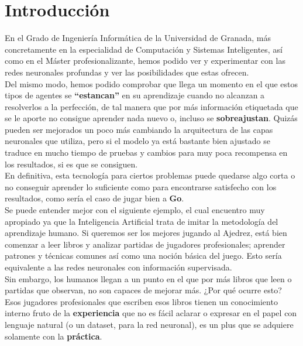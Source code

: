 \documentclass[11pt,fleqn]{book} %
\begin{document}
\section*{Introducción}

En el Grado de Ingeniería Informática de la Universidad de Granada, más concretamente en la especialidad de Computación y Sistemas Inteligentes, así como en el Máster profesionalizante, hemos podido ver y experimentar con las redes neuronales profundas y ver las posibilidades que estas ofrecen. \\

Del mismo modo, hemos podido comprobar que llega un momento en el que estos tipos de agentes se \textbf{``estancan''} en su aprendizaje cuando no alcanzan a resolverlos a la perfección, de tal manera que por más información etiquetada que se le aporte no consigue aprender nada nuevo o, incluso se \textbf{sobreajustan}. Quizás pueden ser mejorados un poco más cambiando la arquitectura de las capas neuronales que utiliza, pero si el modelo ya está bastante bien ajustado se traduce en mucho tiempo de pruebas y cambios para muy poca recompensa en los resultados, si es que se consiguen. \\

En definitiva, esta tecnología para ciertos problemas puede quedarse algo corta o no conseguir aprender lo suficiente como para encontrarse satisfecho con los resultados, como sería el caso de jugar bien a \textbf{Go}.\cite{article:go} \\

Se puede entender mejor con el siguiente ejemplo, el cual encuentro muy apropiado ya que la Inteligencia Artificial trata de imitar la metodología del aprendizaje humano. Si queremos ser los mejores jugando al Ajedrez, está bien comenzar a leer libros y analizar partidas de jugadores profesionales; aprender patrones y técnicas comunes así como una noción básica del juego. Esto sería equivalente a las redes neuronales con información supervisada. \\

Sin embargo, los humanos llegan a un punto en el que por más libros que leen o partidas que observan, no son capaces de mejorar más. ¿Por qué ocurre esto? Esos jugadores profesionales que escriben esos libros tienen un conocimiento interno fruto de la \textbf{experiencia} que no es fácil aclarar o expresar en el papel con lenguaje natural (o un dataset, para la red neuronal), es un plus que se adquiere solamente con la \textbf{práctica}. \\
\end{document}

